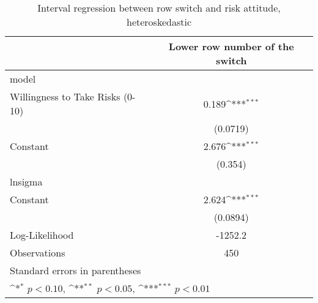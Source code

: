 \begin{table}[htbp]\centering
\def\sym#1{\ifmmode^{#1}\else\(^{#1}\)\fi}
\caption{Interval regression between row switch and risk attitude, heteroskedastic}
\begin{tabular}{l*{1}{c}}
\hline\hline
                    &\multicolumn{1}{c}{Lower row number of the switch}\\
\hline
model               &                     \\
Willingness to Take Risks (0-10)&       0.189\sym{***}\\
                    &    (0.0719)         \\
[1em]
Constant            &       2.676\sym{***}\\
                    &     (0.354)         \\
\hline
lnsigma             &                     \\
Constant            &       2.624\sym{***}\\
                    &    (0.0894)         \\
\hline
Log-Likelihood      &     -1252.2         \\
Observations        &         450         \\
\hline\hline
\multicolumn{2}{l}{\footnotesize Standard errors in parentheses}\\
\multicolumn{2}{l}{\footnotesize \sym{*} \(p<0.10\), \sym{**} \(p<0.05\), \sym{***} \(p<0.01\)}\\
\end{tabular}
\end{table}
